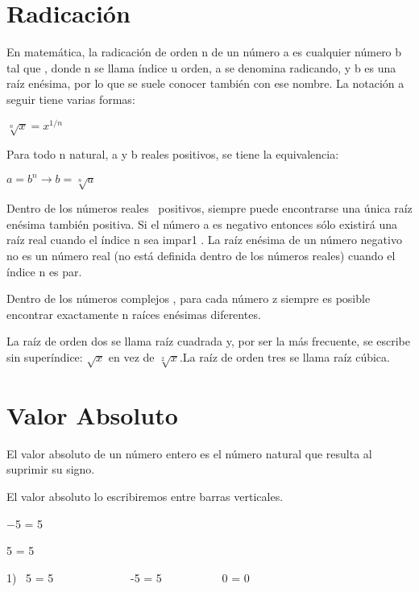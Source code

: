 \documentclass{article}
\begin{document}
\bigskip

\section[Radicaci\'on]{Radicaci\'on}
En matem\'atica, la radicaci\'on de orden n de un n\'umero a es cualquier n\'umero b tal que , donde n se llama \'indice u orden, a se denomina radicando, y b es una ra\'iz en\'esima, por lo que se suele conocer tambi\'en con ese nombre. La notaci\'on a seguir tiene varias formas:

 $\sqrt[n]{x}=x^{1/n}$


\bigskip

Para todo n natural, a y b reales positivos, se tiene la equivalencia:

 $a=b^{n}\rightarrow b=\sqrt[n]{a}$

Dentro de los n\'umeros reales \ positivos, siempre puede encontrarse una \'unica ra\'iz en\'esima tambi\'en positiva. Si el n\'umero a es negativo entonces s\'olo existir\'a una ra\'iz real cuando el \'indice n sea impar1 . La ra\'iz en\'esima de un n\'umero negativo no es un n\'umero real (no est\'a definida dentro de los n\'umeros reales) cuando el \'indice n es par.

Dentro de los n\'umeros complejos , para cada n\'umero z siempre es posible encontrar exactamente n ra\'ices en\'esimas diferentes.

La ra\'iz de orden dos se llama ra\'iz cuadrada y, por ser la m\'as frecuente, se escribe sin super\'indice:  $\sqrt{x}$ en vez de  $\sqrt[2]{x}$.La ra\'iz de orden tres se llama ra\'iz c\'ubica.


\bigskip


\bigskip

\section[Valor Absoluto]{Valor Absoluto}

\bigskip

El valor absoluto de un n\'umero entero es el n\'umero natural que resulta al suprimir su signo.

El valor absoluto lo escribiremos entre barras verticales.

{\textbar}$-$5{\textbar} = 5

{\textbar}5{\textbar} = 5

1) \ {\textbar}5{\textbar} = 5 \ \ \ \ \ \ \ \ \ \ \ \ \ {\textbar}-5 {\textbar}= 5 \ \ \ \ \ \ \ \ \ \ {\textbar}0{\textbar} = 0
\end{document}
